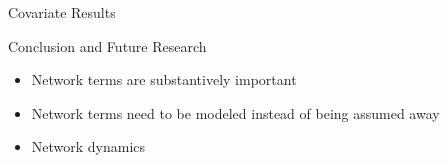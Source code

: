 \documentclass{beamer}
\begin{document}
\begin{frame}{Covariate Results}

\end{frame}






\begin{frame}{Conclusion and Future Research}

\begin{itemize}
\item{Network terms are substantively important}
\item{Network terms need to be modeled instead of being assumed away}
\item{Network dynamics}
\end{itemize}





\end{frame}
\end{document}
